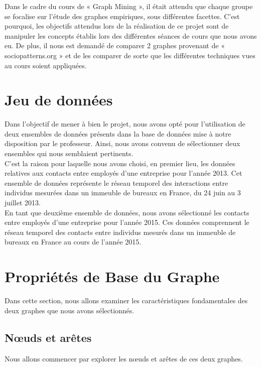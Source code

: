 \documentclass{article}
\begin{document}
Dans le cadre du cours de « Graph Mining », il était attendu que chaque groupe se focalise sur l’étude des graphes empiriques, sous différentes facettes. C’est pourquoi, les objectifs attendus lors de la réalisation de ce projet sont de manipuler les concepts établis lors des différentes séances de cours que nous avons eu. De plus, il nous est demandé de comparer 2 graphes provenant de « sociopatterns.org » et de les comparer de sorte que les différentes techniques vues au cours soient appliquées.

\section{Jeu de données}

Dans l'objectif de mener à bien le projet, nous avons opté pour l'utilisation de deux ensembles de données présents dans la base de données mise à notre disposition par le professeur. Ainsi, nous avons convenu de sélectionner deux ensembles qui nous semblaient pertinents. \\

C'est la raison pour laquelle nous avons choisi, en premier lieu, les données relatives aux contacts entre employés d'une entreprise pour l'année 2013. Cet ensemble de données représente le réseau temporel des interactions entre individus mesurées dans un immeuble de bureaux en France, du 24 juin au 3 juillet 2013. \\

En tant que deuxième ensemble de données, nous avons sélectionné les contacts entre employés d'une entreprise pour l'année 2015. Ces données comprennent le réseau temporel des contacts entre individus mesurés dans un immeuble de bureaux en France au cours de l'année 2015.

\section{Propriétés de Base du Graphe}

Dans cette section, nous allons examiner les caractéristiques fondamentales des deux graphes que nous avons sélectionnés.

\subsection{Nœuds et arêtes}

\noindent
Nous allons commencer par explorer les nœuds et arêtes de ces deux graphes. \\
\end{document}
